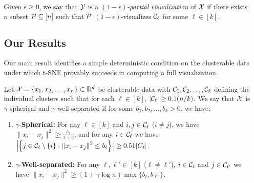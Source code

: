 \begin{defn} \label{def:visualization-partial}
	Given $\epsilon\ge0$, we say that $\mathcal{Y}$ is a \emph{$(1-\epsilon)$-partial visualization} of $\mathcal{X}$ if 
	there exists a subset $\mathcal{P} \subseteq [n]$ such that $\mathcal{P}$ $(1-\epsilon)$-visualizes $\mathcal{C}_\ell$ for some $\ell\in[k]$. 
\end{defn}



\subsection{Our Results}

Our main result identifies a simple deterministic condition on the clusterable data under which t-SNE provably succeeds in computing a full visualization. 


\begin{defn} \label{def:sperical-separated-intro}
	Let $\mathcal{X} = \{ x_1, x_2, \ldots, x_n \} \subset \mathbb{R}^d$ be clusterable data with $\mathcal{C}_1, \mathcal{C}_2,\ldots, \mathcal{C}_k$ defining the individual clusters such that for each $\ell\in[k]$, $|\mathcal{C}_\ell| \ge 0.1 (n/k)$. 
	We say that $\mathcal{X}$ is $\gamma$-spherical and $\gamma$-well-separated if for some $b_1, b_2, \ldots, b_k>0$, we have:
	\begin{enumerate}
		\item $\gamma$-\textbf{Spherical: } For any $ \ell \in [k]$ and $i, j \in \mathcal{C}_{\ell}$ ($i\not=j$), we have $\| x_i - x_j \|^2 \ge \frac{b_\ell}{1+\gamma}$, and for any $i\in \mathcal{C}_{\ell}$ we have $\left| \left\{ j \in \mathcal{C}_{\ell} \setminus\{i\}: \left\|x_i-x_j\right\|^2 \le b_\ell \right\} \right| \ge 0.51 |C_{\ell}|$.
		\item $\gamma$-\textbf{Well-separated: } For any $\ell, \ell' \in [k]$ ($\ell\not=\ell'$), $i \in \mathcal{C}_{\ell}$ and $j\in \mathcal{C}_{\ell'}$ we have $\| x_i - x_j \|^2 \ge  (1+ \gamma \log n)  \max\{b_\ell, b_{\ell'}\}$.
	\end{enumerate}
\end{defn}

